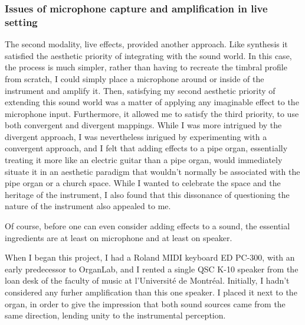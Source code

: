 \documentclass[12pt,twoside,maitrise]{dms_ks}
\theoremstyle{definition}
\begin{document}
\subsubsection{Issues of microphone capture and amplification in live setting}

The second modality, live effects, provided another approach. 
Like synthesis it satisfied the aesthetic priority of integrating with the sound world. 
In this case, the process is much simpler, rather than having to recreate the timbral profile from scratch, I could simply place a microphone around or inside of the instrument and amplify it. 
Then, satisfying my second aesthetic priority of extending this sound world was a matter of applying any imaginable effect to the microphone input. 
Furthermore, it allowed me to satisfy the third priority, to use both convergent and divergent mappings. 
While I was more intrigued by the divergent approach, I was nevertheless inrigued by experimenting with a convergent approach, and I felt that adding effects to a pipe organ, essentially treating it more like an electric guitar than a pipe organ, would immediately situate it in an aesthetic paradigm that wouldn't normally be associated with the pipe organ or a church space. 
While I wanted to celebrate the space and the heritage of the instrument, I also found that this dissonance of questioning the nature of the instrument also appealed to me. 

Of course, before one can even consider adding effects to a sound, the essential ingredients are at least on microphone and at least on speaker. 

When I began this project, I had a Roland MIDI keyboard ED PC-300, with an early predecessor to OrganLab, and I rented a single QSC K-10 speaker from the loan desk of the faculty of music at l'Université de Montréal. 
Initially, I hadn't considered any furher amplification than this one speaker. 
I placed it next to the organ, in order to give the impression that both sound sources came from the same direction, lending unity to the instrumental perception. 
\end{document}

